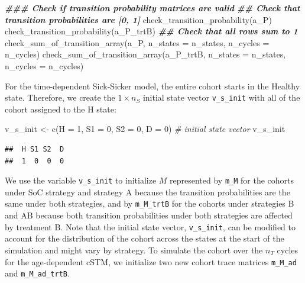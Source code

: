 \documentclass[
]{article}
\newenvironment{Shaded}{\begin{snugshade}}{\end{snugshade}}
\newcommand{\AttributeTok}[1]{\textcolor[rgb]{0.77,0.63,0.00}{#1}}
\newcommand{\CommentTok}[1]{\textcolor[rgb]{0.56,0.35,0.01}{\textit{#1}}}
\newcommand{\DecValTok}[1]{\textcolor[rgb]{0.00,0.00,0.81}{#1}}
\newcommand{\DocumentationTok}[1]{\textcolor[rgb]{0.56,0.35,0.01}{\textbf{\textit{#1}}}}
\newcommand{\FunctionTok}[1]{\textcolor[rgb]{0.00,0.00,0.00}{#1}}
\newcommand{\NormalTok}[1]{#1}
\newcommand{\OtherTok}[1]{\textcolor[rgb]{0.56,0.35,0.01}{#1}}
\begin{document}
\begin{Shaded}
\begin{Highlighting}[]
\DocumentationTok{\#\#\# Check if transition probability matrices are valid}
\DocumentationTok{\#\# Check that transition probabilities are [0, 1]}
\FunctionTok{check\_transition\_probability}\NormalTok{(a\_P)}
\FunctionTok{check\_transition\_probability}\NormalTok{(a\_P\_trtB)}
\DocumentationTok{\#\# Check that all rows sum to 1}
\FunctionTok{check\_sum\_of\_transition\_array}\NormalTok{(a\_P,      }\AttributeTok{n\_states =}\NormalTok{ n\_states, }\AttributeTok{n\_cycles =}\NormalTok{ n\_cycles)}
\FunctionTok{check\_sum\_of\_transition\_array}\NormalTok{(a\_P\_trtB, }\AttributeTok{n\_states =}\NormalTok{ n\_states, }\AttributeTok{n\_cycles =}\NormalTok{ n\_cycles)}
\end{Highlighting}
\end{Shaded}

For the time-dependent Sick-Sicker model, the entire cohort starts in the Healthy state. Therefore, we create the \(1 \times n_S\) initial state vector \texttt{v\_s\_init} with all of the cohort assigned to the H state:

\begin{Shaded}
\begin{Highlighting}[]
\NormalTok{v\_s\_init }\OtherTok{\textless{}{-}} \FunctionTok{c}\NormalTok{(}\AttributeTok{H =} \DecValTok{1}\NormalTok{, }\AttributeTok{S1 =} \DecValTok{0}\NormalTok{, }\AttributeTok{S2 =} \DecValTok{0}\NormalTok{, }\AttributeTok{D =} \DecValTok{0}\NormalTok{) }\CommentTok{\# initial state vector}
\NormalTok{v\_s\_init}
\end{Highlighting}
\end{Shaded}

\begin{verbatim}
##  H S1 S2  D 
##  1  0  0  0
\end{verbatim}

We use the variable \texttt{v\_s\_init} to initialize \(M\) represented by \texttt{m\_M} for the cohorts under SoC strategy and strategy A because the transition probabilities are the same under both strategies, and by \texttt{m\_M\_trtB} for the cohorts under strategies B and AB because both transition probabilities under both strategies are affected by treatment B. Note that the initial state vector, \texttt{v\_s\_init}, can be modified to account for the distribution of the cohort across the states at the start of the simulation and might vary by strategy. To simulate the cohort over the \(n_T\) cycles for the age-dependent cSTM, we initialize two new cohort trace matrices \texttt{m\_M\_ad} and \texttt{m\_M\_ad\_trtB}.
\end{document}
